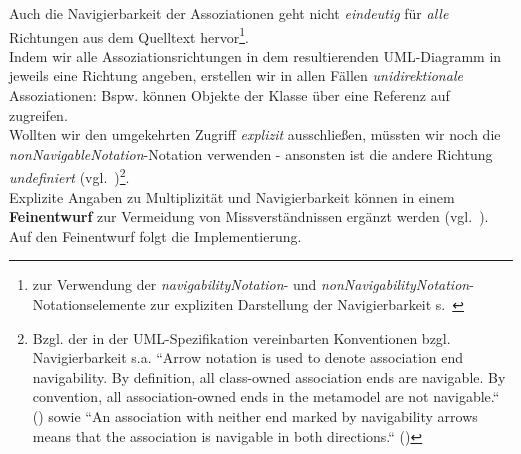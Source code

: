 \noindent
Auch die Navigierbarkeit der Assoziationen geht nicht \textit{eindeutig} für \textit{alle} Richtungen aus dem Quelltext hervor\footnote{
zur Verwendung der \textit{navigabilityNotation}- und \textit{nonNavigabilityNotation}-Notationselemente zur expliziten Darstellung der Navigierbarkeit s.~\cite[203]{OMG17}
}.\\
Indem wir alle Assoziationsrichtungen in dem resultierenden UML-Diagramm in jeweils eine Richtung angeben, erstellen wir in allen Fällen \textit{unidirektionale} Assoziationen: Bspw. können Objekte der Klasse  über eine Referenz auf  zugreifen.\\
Wollten wir den umgekehrten Zugriff \textit{explizit} ausschließen, müssten wir noch die \textit{nonNavigableNotation}-Notation verwenden - ansonsten ist die andere Richtung \textit{undefiniert} (vgl.~\cite[285]{Bal05})\footnote{
    Bzgl. der in der UML-Spezifikation vereinbarten Konventionen bzgl. Navigierbarkeit s.a. ``Arrow notation is used to denote association end navigability. By definition, all class-owned association ends are navigable. By convention, all association-owned ends in the metamodel are not navigable.`` (\cite[18]{OMG17}) sowie ``An association with neither end marked by navigability arrows means that the association is navigable in both directions.`` (\cite[19]{OMG17})
}.\\

\noindent
Explizite Angaben zu Multiplizität und Navigierbarkeit können in einem \textbf{Feinentwurf} zur Vermeidung von Missverständnissen ergänzt werden (vgl.~\cite[415]{Bal05}). Auf den Feinentwurf folgt die Implementierung.
